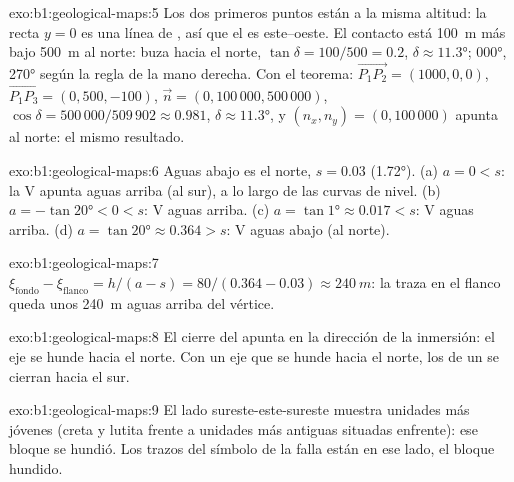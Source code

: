 \begin{solution}{exo:b1:geological-maps:5}
Los dos primeros puntos están a la misma altitud: la recta $y = 0$ es una línea de , así que
el  es este--oeste. El contacto está \qty{100}{m} más bajo \qty{500}{m} al norte: buza hacia el
norte, $\tan\delta = 100/500 = 0.2$, $\delta \approx \ang{11.3}$; 
\ang{000},  \ang{270} según la regla de la mano derecha. Con el teorema:
$\overrightarrow{P_1P_2} = (1000, 0, 0)$,
$\overrightarrow{P_1P_3} = (0, 500, -100)$, $\vec n = (0, 100\,000,
500\,000)$, $\cos\delta = 500\,000/509\,902 \approx 0.981$, $\delta \approx
\ang{11.3}$, y $(n_x, n_y) = (0, 100\,000)$ apunta al norte: el mismo resultado.
\end{solution}

\begin{solution}{exo:b1:geological-maps:6}
Aguas abajo es el norte, $s = 0.03$ (\ang{1.72}). (a) $a = 0 < s$: la V apunta aguas arriba
(al sur), a lo largo de las curvas de nivel. (b) $a = -\tan\ang{20} < 0 < s$: V aguas arriba.
(c) $a = \tan\ang{1} \approx 0.017 < s$: V aguas arriba. (d) $a = \tan\ang{20}
\approx 0.364 > s$: V aguas abajo (al norte).
\end{solution}

\begin{solution}{exo:b1:geological-maps:7}
$\xi_{\text{fondo}} - \xi_{\text{flanco}} = h/(a - s) = 80/(0.364 - 0.03)
\approx \qty{240}{m}$: la traza en el flanco queda unos \qty{240}{m} aguas arriba del vértice.
\end{solution}

\begin{solution}{exo:b1:geological-maps:8}
El cierre del  apunta en la dirección de la inmersión: el eje se hunde hacia el norte.
Con un eje que se hunde hacia el norte, los  de un  se cierran hacia el
sur.
\end{solution}

\begin{solution}{exo:b1:geological-maps:9}
El lado sureste-este-sureste muestra unidades más jóvenes (creta y lutita frente a unidades más
antiguas situadas enfrente): ese bloque se hundió. Los trazos del símbolo de la falla están en ese
lado, el bloque hundido.
\end{solution}


